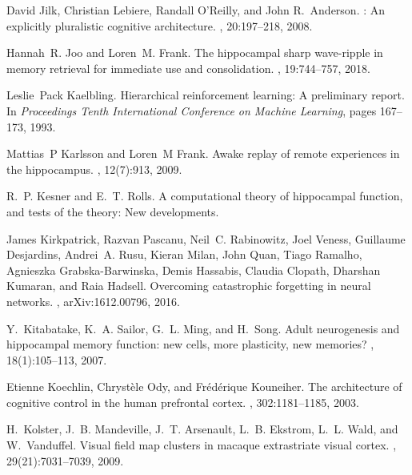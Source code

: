 \documentclass[letterpaper,11pt]{article}
\begin{document}
\begin{thebibliography}{100}
David Jilk, Christian Lebiere, Randall O'Reilly, and John R.~Anderson.
: An explicitly pluralistic cognitive architecture.
,
  20:197--218, 2008.

Hannah~R. Joo and Loren~M. Frank.
\newblock The hippocampal sharp wave-ripple in memory retrieval for immediate
  use and consolidation.
, 19:744--757, 2018.

Leslie~Pack Kaelbling.
\newblock Hierarchical reinforcement learning: A preliminary report.
\newblock In {\em Proceedings Tenth International Conference on Machine
  Learning}, pages 167--173, 1993.

Mattias~P Karlsson and Loren~M Frank.
\newblock Awake replay of remote experiences in the hippocampus.
, 12(7):913, 2009.

R.~P. Kesner and E.~T. Rolls.
\newblock A computational theory of hippocampal function, and tests of the
  theory: {N}ew developments.

James Kirkpatrick, Razvan Pascanu, Neil~C. Rabinowitz, Joel Veness, Guillaume
  Desjardins, Andrei~A. Rusu, Kieran Milan, John Quan, Tiago Ramalho, Agnieszka
  Grabska{-}Barwinska, Demis Hassabis, Claudia Clopath, Dharshan Kumaran, and
  Raia Hadsell.
\newblock Overcoming catastrophic forgetting in neural networks.
, arXiv:1612.00796, 2016.

Y.~Kitabatake, K.~A. Sailor, G.~L. Ming, and H.~Song.
\newblock Adult neurogenesis and hippocampal memory function: new cells, more
  plasticity, new memories?
, 18(1):105--113, 2007.

Etienne Koechlin, Chryst\`{e}le Ody, and Fr\'{e}d\'{e}rique Kouneiher.
\newblock The architecture of cognitive control in the human prefrontal cortex.
, 302:1181--1185, 2003.

H.~Kolster, J.~B. Mandeville, J.~T. Arsenault, L.~B. Ekstrom, L.~L. Wald, and
  W.~Vanduffel.
\newblock Visual field map clusters in macaque extrastriate visual cortex.
, 29(21):7031--7039, 2009.


\end{thebibliography}
\end{document}
